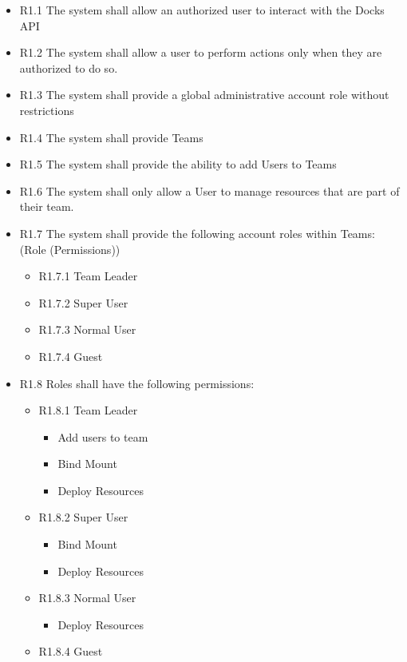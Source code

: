 \documentclass[]{article}
\begin{document}
\begin{itemize}
	\item R1.1 The system shall allow an authorized user to interact with the Docks API
	\item R1.2 The system shall allow a user to perform actions only when they are authorized to do so.
	\item R1.3 The system shall provide a global administrative account role without restrictions
	\item R1.4 The system shall provide Teams
	\item R1.5 The system shall provide the ability to add Users to Teams
	\item R1.6 The system shall only allow a User to manage resources that are part of their team.
	\item R1.7 The system shall provide the following account roles within Teams: (Role (Permissions))
	      \begin{itemize}
		      \item R1.7.1 Team Leader
		      \item R1.7.2 Super User
		      \item R1.7.3 Normal User
		      \item R1.7.4 Guest
	      \end{itemize}
	\item R1.8 Roles shall have the following permissions:
	      \begin{itemize}
		      \item R1.8.1 Team Leader
		            \begin{itemize}
			            \item Add users to team
			            \item Bind Mount
			            \item Deploy Resources
		            \end{itemize}
		      \item R1.8.2 Super User
		            \begin{itemize}
			            \item Bind Mount
			            \item Deploy Resources
		            \end{itemize}
		      \item R1.8.3 Normal User
		            \begin{itemize}
			            \item Deploy Resources
		            \end{itemize}
		      \item R1.8.4 Guest

\end{itemize}
\end{itemize}
\end{document}
